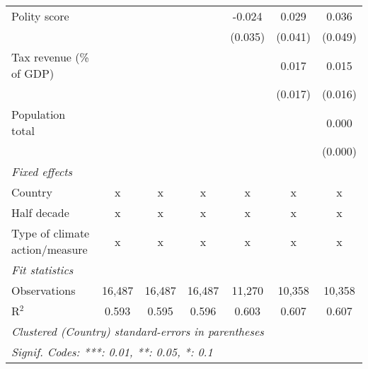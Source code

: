 \begin{tabular}{lcccccc}
   Polity score                                                          &         &                &                & -0.024         & 0.029          & 0.036\\   
                                                                         &         &                &                & (0.035)        & (0.041)        & (0.049)\\   
   Tax revenue (\% of GDP)                                               &         &                &                &                & 0.017          & 0.015\\   
                                                                         &         &                &                &                & (0.017)        & (0.016)\\   
   Population total                                                      &         &                &                &                &                & 0.000\\   
                                                                         &         &                &                &                &                & (0.000)\\   
   \emph{Fixed effects}\\
   Country                                                               & x       & x              & x              & x              & x              & x\\  
   Half decade                                                           & x       & x              & x              & x              & x              & x\\  
   Type of climate action/measure                                        & x       & x              & x              & x              & x              & x\\  
   \midrule \emph{Fit statistics}\\
   Observations                                                          & 16,487  & 16,487         & 16,487         & 11,270         & 10,358         & 10,358\\  
   R$^2$                                                                 & 0.593   & 0.595          & 0.596          & 0.603          & 0.607          & 0.607\\  
   \midrule
   \multicolumn{7}{l}{\emph{Clustered (Country) standard-errors in parentheses}}\\
   \multicolumn{7}{l}{\emph{Signif. Codes: ***: 0.01, **: 0.05, *: 0.1}}\\
\end{tabular}
\par\endgroup


